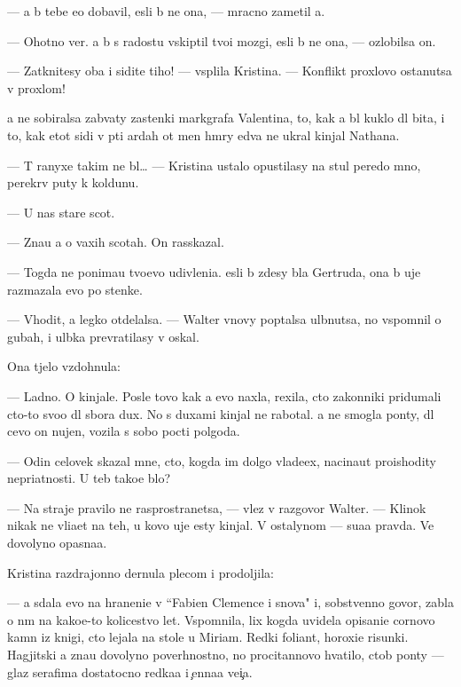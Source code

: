 \documentclass[10pt]{book}
\begin{document}
— {\Y}a b{\yi} tebe {\y}e{\x}o dobavil, {\y}esli b{\yi} ne ona, — mracno zametil {\y}a.

— Ohotno ver{\iu}. {\Y}a b{\yi} s radost{\y}u vskip{\ia}til tvo{\y}i mozgi, {\y}esli b{\yi} ne ona, — ozlobilsa on.

— Zatknitesy oba i sidite tiho! — vsp{\yi}lila Kristina. — Konflikt{\yi} proxlovo ostanutsa v proxlom!

{\Y}a ne sobiralsa zab{\yi}vaty zastenki markgrafa Valentina, to, kak {\y}a b{\yi}l kuklo{\y} dl{\ia} bit{\y}a, i to, kak etot sid{\ia}{\x}i{\y} v p{\ia}ti {\y}ardah ot men{\ia} hm{\yi}ry {\y}edva ne ukral kinjal Nathana.

— T{\yi} ranyxe takim ne b{\yi}l… — Kristina ustalo opustilasy na stul peredo mno{\y}, perekr{\yi}v puty k koldunu.

— U nas star{\yi}{\y}e scot{\yi}.

— Zna{\y}u {\y}a o vaxih scotah. On rasskazal.

— Togda ne ponima{\y}u tvo{\y}evo udivleni{\y}a. {\Y}esli b{\yi} zdesy b{\yi}la Gertruda, ona b{\yi} uje razmazala {\y}evo po stenke.

— V{\yi}hodit, {\y}a legko otdelalsa. — Walter vnovy pop{\yi}talsa ul{\yi}bnutsa, no vspomnil o gubah, i ul{\yi}bka prevratilasy v oskal.

Ona t{\ia}jelo vzdohnula:

— Ladno. O kinjale. Posle tovo kak {\y}a {\y}evo naxla, rexila, cto zakonniki pridumali cto-to svo{\y}o dl{\ia} sbora dux. No s duxami kinjal ne rabotal. {\Y}a ne smogla pon{\ia}ty, dl{\ia} cevo on nujen, vozila s sobo{\y} pocti polgoda.

— Odin celovek skazal mne, cto, kogda im dolgo vlade{\y}ex, nacina{\y}ut proishodity nepri{\y}atnosti. U teb{\ia} tako{\y}e b{\yi}lo?

— Na straje{\y} pravilo ne rasprostran{\ia}{\y}etsa, — vlez v razgovor Walter. — Klinok nikak ne vli{\y}a{\y}et na teh, u kovo uje {\y}esty kinjal{\yi}. V ostalynom — su{\x}a{\y}a pravda. Ve{\x} dovolyno opasna{\y}a.

Kristina razdrajonno dernula plecom i prodoljila:

— {\Y}a sdala {\y}evo na hraneni{\y}e v ``Fabien Clemence i s{\yi}nov{\y}a" i, sobstvenno govor{\ia}, zab{\yi}la o n{\e}m na kako{\y}e-to kolicestvo let. Vspomnila, lix kogda uvidela opisani{\y}e cornovo kamn{\ia} iz knigi, cto lejala na stole u Miriam. Redki{\y} foliant, horoxi{\y}e risunki. Hagjitski{\y} {\y}a zna{\y}u dovolyno poverhnostno, no procitannovo hvatilo, ctob{\yi} pon{\ia}ty — glaz serafima dostatocno redka{\y}a i {\c}enna{\y}a ve{\x}i{\c}a.
\end{document}
